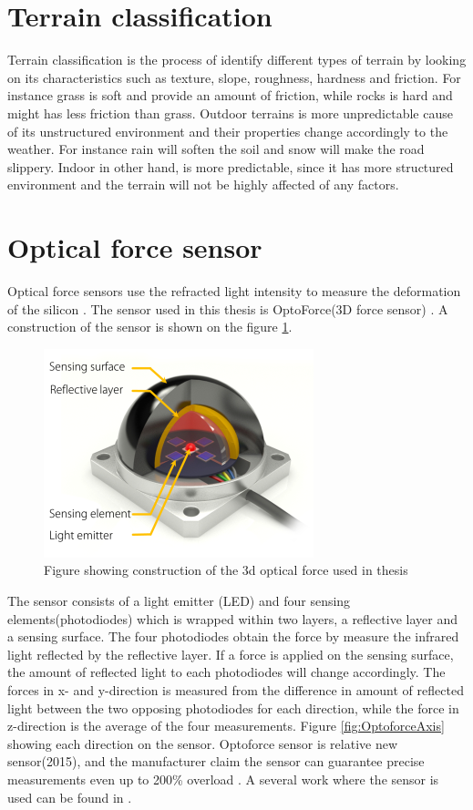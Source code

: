 \documentclass[USenglish]{ifimaster}  %
\begin{document}
	\section{Terrain classification}
	Terrain classification is the process of identify different types of terrain by looking on its characteristics such as texture, slope, roughness, hardness and friction. For instance grass is soft and provide an amount of friction, while rocks is hard and might has less friction than grass. Outdoor terrains is more unpredictable cause of its unstructured environment and their properties change accordingly to the weather. For instance rain will soften the soil and snow will make the road slippery. Indoor in other hand, is more predictable, since it has more structured environment and the terrain will not be highly affected of any factors.
	
	
	\section{Optical force sensor}
	Optical force sensors use the refracted light intensity to measure the deformation of the silicon \cite{6027100}\cite{6907805}. The sensor used in this thesis is OptoForce(3D force sensor) \cite{Optoforce}. A construction of the sensor is shown on the figure \ref{fig:OptoforceBuild}. 
	\begin{figure}[h]
		\centering
		\includegraphics[scale=0.8]{Figures/OptoforceBuild}
		\caption{Figure showing construction of the 3d optical force used in thesis \cite{OptoforceFig}}
		\label{fig:OptoforceBuild}
	\end{figure}
	\FloatBarrier
	
	The sensor consists of a light emitter (LED) and four sensing elements(photodiodes) which is wrapped within two layers, a reflective layer and a sensing surface. The four photodiodes obtain the force by measure the infrared light reflected by the reflective layer. If a force is applied on the sensing surface, the amount of reflected light to each photodiodes will change accordingly. The forces in x- and y-direction is measured from the difference in amount of reflected light between the two opposing photodiodes for each direction, while the force in z-direction is the average of the four measurements. Figure \ref{fig:OptoforceAxis} showing each direction on the sensor. Optoforce sensor is relative new sensor(2015), and the manufacturer claim the sensor can guarantee precise measurements even up to 200\% overload \cite{Optoforce2}. A several work where the sensor is used can be found in \cite{7803326,7759112,7849467}.
	
\end{document}
